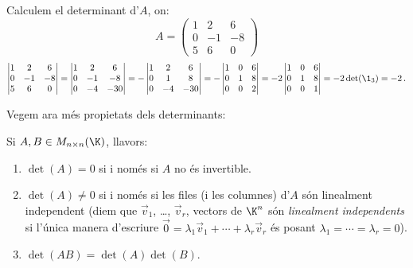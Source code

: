\begin{exemple}
	Calculem el determinant d'$A$, on:$$
	A=\begin{pmatrix}
	1 & 2 & 6 \\ 0 & -1 & -8 \\ 5 & 6 & 0
	\end{pmatrix}
	$$
	$$
	\begin{vmatrix}
	1 & 2 & 6 \\ 0 & -1 & -8 \\ 5 & 6 & 0
	\end{vmatrix}=
	\begin{vmatrix}
	1 & 2 & 6 \\ 0 & -1 & -8 \\ 0 & -4 & -30
	\end{vmatrix}=
	-\begin{vmatrix}
	1 & 2 & 6 \\ 0 & 1 & 8 \\ 0 & -4 & -30
	\end{vmatrix}=
	-\begin{vmatrix}
	1 & 0 & 6 \\ 0 & 1 & 8 \\ 0 & 0 & 2
	\end{vmatrix}=
	-2\begin{vmatrix}
	1 & 0 & 6 \\ 0 & 1 & 8 \\ 0 & 0 & 1
	\end{vmatrix}= -2 \det(\1_3)=-2\,.
	$$
\end{exemple}
Vegem ara més propietats dels determinants:
\begin{proposicio}
	Si $A, B\in M_{n\times n}(\K)$, llavors:
	\begin{enumerate}[\rm (a)]
		\item $\det(A)=0$ si i només si $A$ no és invertible.
		\item $\det(A)\neq 0$ si i només si les files (i les columnes) d'$A$ són linealment independent (diem que $\vec{v}_1$, \ldots, $\vec{v}_r$, vectors de $\K^n$ són \emph{linealment independents} si l'única manera d'escriure $\vec{0}=\lambda_1 \vec{v}_1 + \cdots + \lambda_r\vec{v}_r$ és posant $\lambda_1=\cdots=\lambda_r=0$).
		\item $\det(AB)=\det(A)\det(B)$.
	\end{enumerate}
\end{proposicio}
